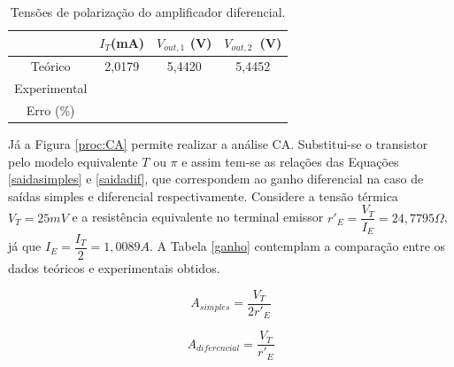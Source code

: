 \documentclass[a4paper,12pt,oneside,openany,table,xcdraw]{article}
\begin{document}
\vspace{0.2cm}
\begin{table} [H]
\centering
\def\arraystretch{1.38}
\caption{Tensões de polarização do amplificador diferencial. } \label{dados}
\begin{tabular}{|c|c|c|c|} 
\hhline{~---|}
\multicolumn{1}{c|}{}                            & {\cellcolor[rgb]{0.937,0.937,0.937}}\textbf{$I_{T}$(mA)} & {\cellcolor[rgb]{0.937,0.937,0.937}}\textbf{$V_{out, 1}$ (V)} & {\cellcolor[rgb]{0.937,0.937,0.937}}\textbf{$V_{out, 2}$~(V)}  \\ 
\hline
{\cellcolor[rgb]{0.937,0.937,0.937}}Teórico      & 2,0179                                                   & 5,4420                                                        & 5,4452                                                         \\ 
\hline
{\cellcolor[rgb]{0.937,0.937,0.937}}Experimental &                                                          &                                                               &                                                                \\ 
\hline
{\cellcolor[rgb]{0.937,0.937,0.937}}Erro (\%)        &                                                          &                                                               &                                                                \\
\hline
\end{tabular}
\end{table}

\vspace{0.2cm}
Já a Figura \ref{proc:CA} permite realizar a análise CA. Substitui-se o transistor pelo modelo equivalente $T$ ou $\pi$ e assim tem-se as relações das Equações \ref{saidasimples} e \ref{saidadif}, que correspondem ao ganho diferencial na caso de saídas simples e diferencial respectivamente. Considere a tensão térmica $V_{T}=25 mV$ e a resistência equivalente no terminal emissor $r'_{E}=\dfrac{V_{T}}{I_{E}} = 24,7795 \Omega$, já que $I_{E} = \dfrac{I_{T}}{2} = 1,0089 A$. A Tabela \ref{ganho} contemplam a comparação entre os dados teóricos e experimentais obtidos.

\begin{equation} \label{saidasimples}
A_{simples} = \dfrac{V_{T}}{2 r'_{E}}
\end{equation}

\begin{equation} \label{saidadif}
A_{diferencial} = \dfrac{V_{T}}{r'_{E}}
\end{equation}
\end{document}
